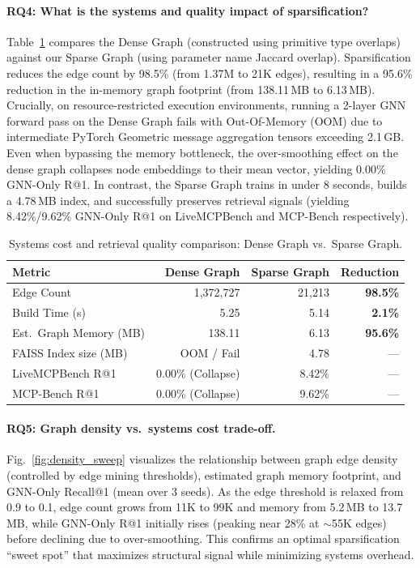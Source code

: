 \documentclass[conference]{IEEEtran}
\begin{document}
\paragraph{RQ4: What is the systems and quality impact of sparsification?}
Table~\ref{tab:sparsification_comparison} compares the Dense Graph (constructed using primitive type overlaps) against our Sparse Graph (using parameter name Jaccard overlap). 
Sparsification reduces the edge count by 98.5\% (from 1.37M to 21K edges), resulting in a 95.6\% reduction in the in-memory graph footprint (from 138.11\,MB to 6.13\,MB). 
Crucially, on resource-restricted execution environments, running a 2-layer GNN forward pass on the Dense Graph fails with Out-Of-Memory (OOM) due to intermediate PyTorch Geometric message aggregation tensors exceeding 2.1\,GB. 
Even when bypassing the memory bottleneck, the over-smoothing effect on the dense graph collapses node embeddings to their mean vector, yielding 0.00\% GNN-Only R@1. 
In contrast, the Sparse Graph trains in under 8 seconds, builds a 4.78\,MB index, and successfully preserves retrieval signals (yielding 8.42\%/9.62\% GNN-Only R@1 on LiveMCPBench and MCP-Bench respectively).

\begin{table}[htbp]
\centering
\caption{Systems cost and retrieval quality comparison: Dense Graph vs.\ Sparse Graph.}
\label{tab:sparsification_comparison}
\begin{tabular}{lrrr}
\toprule
Metric & Dense Graph & Sparse Graph & Reduction \\
\midrule
Edge Count & 1,372,727 & 21,213 & \textbf{98.5\%} \\
Build Time (s) & 5.25 & 5.14 & \textbf{2.1\%} \\
Est.\ Graph Memory (MB) & 138.11 & 6.13 & \textbf{95.6\%} \\
FAISS Index size (MB) & OOM / Fail & 4.78 & --- \\
\midrule
LiveMCPBench R@1 & 0.00\% (Collapse) & 8.42\% & --- \\
MCP-Bench R@1 & 0.00\% (Collapse) & 9.62\% & --- \\
\bottomrule
\end{tabular}
\end{table}

\paragraph{RQ5: Graph density vs.\ systems cost trade-off.}
Fig.~\ref{fig:density_sweep} visualizes the relationship between
graph edge density (controlled by edge mining thresholds), estimated
graph memory footprint, and GNN-Only Recall@1 (mean over 3 seeds).
As the edge threshold is relaxed from 0.9 to 0.1, edge count grows
from 11K to 99K and memory from 5.2\,MB to 13.7\,MB, while GNN-Only
R@1 initially rises (peaking near 28\% at $\sim$55K edges) before
declining due to over-smoothing. This confirms an optimal
sparsification ``sweet spot'' that maximizes structural signal while
minimizing systems overhead.
\end{document}
